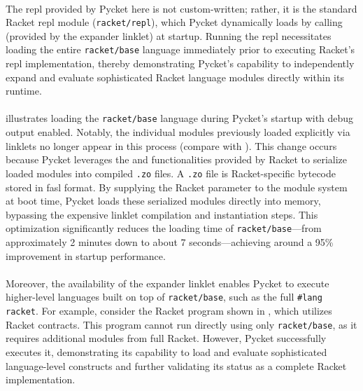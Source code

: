 		\paragraph{}%
			The \gls{repl} provided by Pycket here is not custom-written; rather, it is the standard Racket \gls{repl} module (\texttt{racket/repl}), which Pycket dynamically loads by calling  (provided by the expander linklet) at startup. Running the \gls{repl} necessitates loading the entire \texttt{racket/base} language immediately prior to executing Racket’s \gls{repl} implementation, thereby demonstrating Pycket's capability to independently expand and evaluate sophisticated Racket language modules directly within its runtime.


		\paragraph{}%
			 illustrates loading the \texttt{racket/base} language during Pycket's startup with debug output enabled. Notably, the individual modules previously loaded explicitly via linklets no longer appear in this process (compare with ). This change occurs because Pycket leverages the  and  functionalities provided by Racket to serialize loaded modules into compiled \texttt{.zo} files. A \texttt{.zo} file is Racket-specific bytecode stored in fasl format. By supplying the Racket parameter  to the module system at boot time, Pycket loads these serialized modules directly into memory, bypassing the expensive linklet compilation and instantiation steps. This optimization significantly reduces the loading time of \texttt{racket/base}—from approximately 2 minutes down to about 7 seconds—achieving around a 95\% improvement in startup performance.

		\paragraph{}%
			Moreover, the availability of the expander linklet enables Pycket to execute higher-level languages built on top of \texttt{racket/base}, such as the full \texttt{\#lang racket}. For example, consider the Racket program shown in , which utilizes Racket contracts. This program cannot run directly using only \texttt{racket/base}, as it requires additional modules from full Racket. However, Pycket successfully executes it, demonstrating its capability to load and evaluate sophisticated language-level constructs and further validating its status as a complete Racket implementation.

